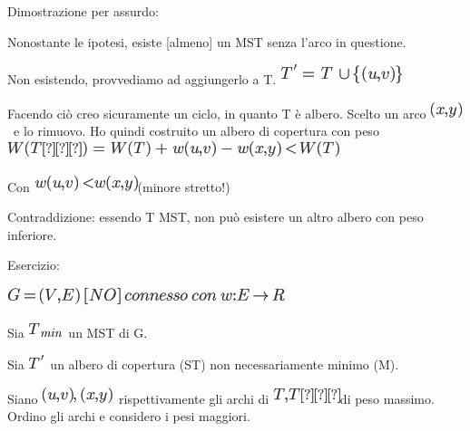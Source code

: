 \documentclass{article}
\begin{document}
{Dimostrazione per assurdo:}

{Nonostante le ipotesi, esiste {[}almeno{]} un MST senza l'arco in
questione.}

{Non esistendo, provvediamo ad aggiungerlo a T.
}\includegraphics{images/image469.png}

{Facendo ciò creo sicuramente un ciclo, in quanto T è albero. Scelto un
arco }\includegraphics{images/image455.png}{~e lo rimuovo. Ho quindi
costruito un albero di copertura con peso
}\includegraphics{images/image470.png}

{Con }\includegraphics{images/image471.png}{(minore stretto!)}

{Contraddizione}{: essendo T MST, non può esistere un altro albero con
peso inferiore.}

{}

{}

{Esercizio}{:}

\includegraphics{images/image472.png}

{Sia }\includegraphics{images/image473.png}{~un MST di G.}

{Sia }\includegraphics{images/image463.png}{~un albero di copertura (ST)
non necessariamente minimo (M).}

{Siano }\includegraphics{images/image474.png}{~rispettivamente gli archi
di }\includegraphics{images/image475.png}{di peso massimo. Ordino gli
archi e considero i pesi maggiori.}
\end{document}
